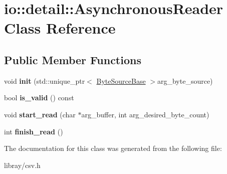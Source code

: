 \hypertarget{classio_1_1detail_1_1AsynchronousReader}{}\section{io\+:\+:detail\+:\+:Asynchronous\+Reader Class Reference}
\label{classio_1_1detail_1_1AsynchronousReader}
\subsection*{Public Member Functions}
\begin{DoxyCompactItemize}
\item 
\mbox{\label{classio_1_1detail_1_1AsynchronousReader_a12ed45f881a671b473d95ded7ad1474c}} 
void {\bfseries init} (std\+::unique\+\_\+ptr$<$ \hyperlink{classio_1_1ByteSourceBase}{Byte\+Source\+Base} $>$arg\+\_\+byte\+\_\+source)
\item 
\mbox{\label{classio_1_1detail_1_1AsynchronousReader_ab6b6f8483008208fc3f529f94c7125e2}} 
bool {\bfseries is\+\_\+valid} () const
\item 
\mbox{\label{classio_1_1detail_1_1AsynchronousReader_a9818851dbb994042d0d84183220e71c6}} 
void {\bfseries start\+\_\+read} (char $\ast$arg\+\_\+buffer, int arg\+\_\+desired\+\_\+byte\+\_\+count)
\item 
\mbox{\label{classio_1_1detail_1_1AsynchronousReader_a94520530423e9bfeb04c23ea4e3a8786}} 
int {\bfseries finish\+\_\+read} ()
\end{DoxyCompactItemize}


The documentation for this class was generated from the following file\+:\begin{DoxyCompactItemize}
\item 
libray/csv.\+h\end{DoxyCompactItemize}
